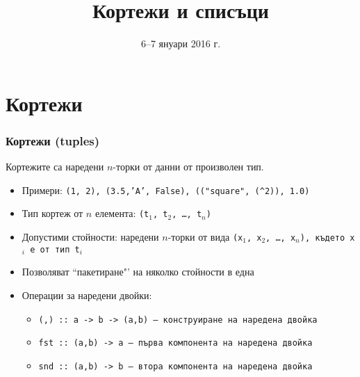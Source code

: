 \documentclass{beamer}
\title{Кортежи и списъци}
\date{6--7 януари 2016 г.}
\begin{document}
\begin{frame}
  \titlepage
\end{frame}


\section{Кортежи}

\begin{frame}
  \frametitle{Кортежи (tuples)}
  Кортежите са наредени $n$-торки от данни от произволен тип.
  \begin{itemize}[<+->]
  \item Примери: \tt{(1, 2)}, \tt{(3.5,'A', False)}, \tt{(("square"{}, (\^{}2)), 1.0)}
  \item Тип кортеж от $n$ елемента: \tt{(t$_1$, t$_2$, \ldots, t$_n$)}
  \item Допустими стойности: наредени $n$-торки от вида \tt{(x$_1$, x$_2$, \ldots, x$_n$)}, където \tt{x$_i$} е от тип \tt{t$_i$}
  \item Позволяват ``пакетиране"' на няколко стойности в една
  \item Операции за наредени двойки:
    \begin{itemize}
    \item \tt{(,) :: a -> b -> (a,b)} --- конструиране на наредена двойка
    \item \tt{fst :: (a,b) -> a} --- първа компонента на наредена двойка
    \item \tt{snd :: (a,b) -> b} --- втора компонента на наредена двойка
    \end{itemize}
  \end{itemize}
\end{frame}
\end{document}
